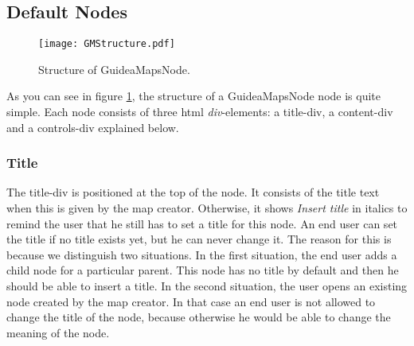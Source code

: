 \subsection{Default Nodes}

\begin{figure}[H]
	\centering
	\texttt{[image: GMStructure.pdf]}
	\caption{Structure of GuideaMapsNode.}
	\label{fig:gmnodestructure}
\end{figure}

As you can see in figure \ref{fig:gmnodestructure}, the structure of a GuideaMapsNode node is quite simple. Each node consists of three html \textit{div}-elements: a title-div, a content-div and a controls-div explained below.

\subsubsection{Title}
The title-div is positioned at the top of the node. It consists of the title text when this is given by the map creator. Otherwise, it shows \textit{Insert title} in italics to remind the user that he still has to set a title for this node. An end user can set the title if no title exists yet, but he can never change it. The reason for this is because we distinguish two situations. In the first situation, the end user adds a child node for a particular parent. This node has no title by default and then he should be able to insert a title. In the second situation, the user opens an existing node created by the map creator. In that case an end user is not allowed to change the title of the node, because otherwise he would be able to change the meaning of the node. \\

